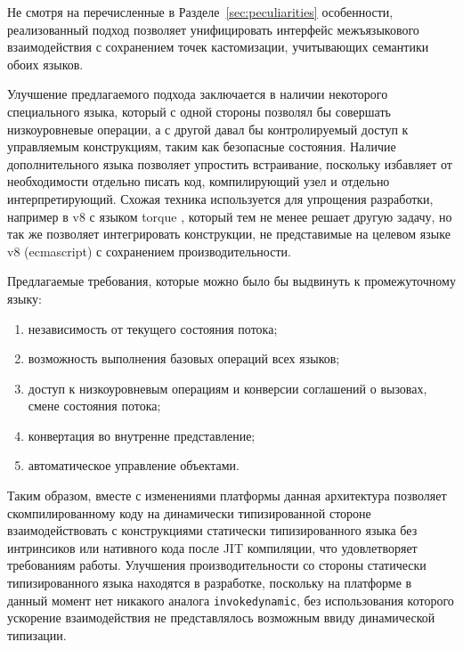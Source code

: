 \documentclass[times
]{itmo-student-thesis}
\def\Indy{\texttt{invokedynamic}}
\begin{document}

\chapterconclusion
Не смотря на перечисленные в Разделе~\ref{sec:peculiarities} особенности, реализованный подход позволяет унифицировать интерфейс межъязыкового взаимодействия с сохранением точек кастомизации, учитывающих семантики обоих языков.

Улучшение предлагаемого подхода заключается в наличии некоторого специального языка, который с одной стороны позволял бы совершать низкоуровневые операции, а с другой давал бы контролируемый доступ к управляемым конструкциям, таким как безопасные состояния. Наличие дополнительного языка позволяет упростить встраивание, поскольку избавляет от необходимости отдельно писать код, компилирующий узел и отдельно интерпретирующий. Схожая техника используется для упрощения разработки, например в v8 с языком torque \cite{torque}, который тем не менее решает другую задачу, но так же позволяет интегрировать конструкции, не представимые на целевом языке v8 (ecmascript) с сохранением производительности.

Предлагаемые требования, которые можно было бы выдвинуть к промежуточному языку:
\begin{enumerate}
	\item независимость от текущего состояния потока;
	\item возможность выполнения базовых операций всех языков;
	\item доступ к низкоуровневым операциям и конверсии соглашений о вызовах, смене состояния потока;
	\item конвертация во внутренне представление;
	\item автоматическое управление объектами.
\end{enumerate}

Таким образом, вместе с изменениями платформы данная архитектура позволяет скомпилированному коду на динамически типизированной стороне взаимодействовать с конструкциями статически типизированного языка без интринсиков или нативного кода после JIT компиляции, что удовлетворяет требованиям работы. Улучшения производительности со стороны статически типизированного языка находятся в разработке, поскольку на платформе в данный момент нет никакого аналога \Indy, без использования которого ускорение взаимодействия не представлялось возможным ввиду динамической типизации.
\end{document}

